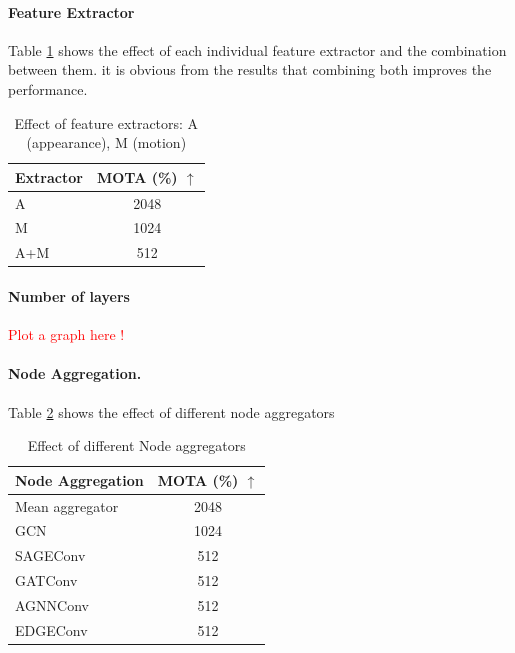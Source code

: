\documentclass[10pt,twocolumn,letterpaper]{article}
\newcommand\myworries[1]{\textcolor{red}{#1}}
\begin{document}
\paragraph{Feature Extractor}
Table \ref{tab:feat_extractor} shows the effect of each individual feature extractor and the combination between them. it is obvious from the results that combining both improves the performance.

\begin{table}
\begin{center}
\begin{tabular}{|l c|}
\hline
Extractor & MOTA (\%) $\uparrow$ \\
\hline\hline
A & 2048  \\
M & 1024  \\
A+M  & 512  \\
\hline
\end{tabular}
\end{center}
\caption{Effect of feature extractors: A (appearance), M (motion)}
\label{tab:feat_extractor}
\end{table}

\paragraph{Number of layers}
\myworries{Plot a graph here !}

\paragraph{Node Aggregation.}

Table \ref{tab:node_aggregator} shows the effect of different node aggregators

\begin{table}
\begin{center}
\begin{tabular}{|l c|}
\hline
Node Aggregation & MOTA (\%) $\uparrow$ \\
\hline\hline
Mean aggregator & 2048  \\
GCN \cite{kipf2016semi}& 1024  \\
SAGEConv \cite{hamilton2017inductive} & 512  \\
GATConv \cite{velivckovic2017graph}  & 512  \\
AGNNConv \cite{thekumparampil2018attention}  & 512  \\
EDGEConv  \cite{wang2019dynamic} & 512  \\
\hline
\end{tabular}
\end{center}
\caption{Effect of different Node aggregators}
\label{tab:node_aggregator}
\end{table}
\end{document}
